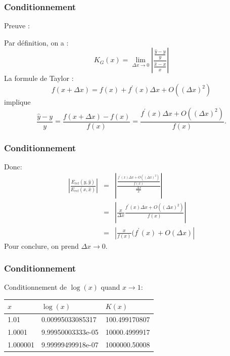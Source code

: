 \documentclass{beamer}
\begin{document}

\begin{frame}
\frametitle{Conditionnement}

Preuve :

Par définition, on a :
$$
K_G(x)
= \lim_{\Delta x \rightarrow 0} \left| \frac{\frac{\hat{y} - y}{y}}{\frac{\hat{x} - x}{x}}\right|
$$
La formule de Taylor :
$$
f(x+\Delta x) = f(x) + f^\prime(x)\Delta x 
		+ O((\Delta x)^2)
$$
implique
$$
\frac{\hat{y} - y}{y}
= \frac{f(x+\Delta x) - f(x)}{f(x)} 
= \frac{f^\prime(x)\Delta x + O((\Delta x)^2)}{f(x)}.
$$
\end{frame}


\begin{frame}
\frametitle{Conditionnement}

Donc:
\begin{eqnarray}
\left| \frac{E_{rel}(y,\hat{y})}{E_{rel}(x,\hat{x})}\right|
&=& \left| \frac{\frac{f^\prime(x)\Delta x + O((\Delta x)^2)}{f(x)}}{\frac{\Delta x}{x}}\right| \\
&=& \left| \frac{x}{\Delta x} \frac{f^\prime(x)\Delta x + O((\Delta x)^2)}{f(x)}\right| \\
&=& \left| \frac{x}{f(x)} (f^\prime(x) + O(\Delta x)\right|
\end{eqnarray}
Pour conclure, on prend $\Delta x \rightarrow 0$. 

\end{frame}


\begin{frame}
\frametitle{Conditionnement}

Conditionnement de $\log(x)$ quand $x\rightarrow 1$:

\begin{center}
\begin{tabular}{lll}
$x$ & $\log(x)$ & $K(x)$ \\
\hline
1.01 & 0.00995033085317 & 100.499170807\\
1.0001 & 9.99950003333e-05 & 10000.4999917 \\
1.000001 & 9.99999499918e-07 & 1000000.50008\\
\end{tabular}
\end{center}

\end{frame}
\end{document}
